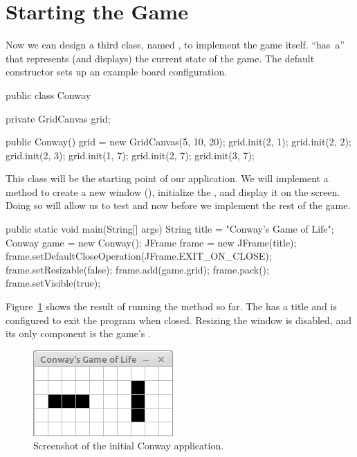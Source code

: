 \section{Starting the Game}

Now we can design a third class, named , to implement the game itself.
 ``has~a''  that represents (and displays) the current state of the game.
The default constructor sets up an example board configuration.

\begin{code}
public class Conway {
    private GridCanvas grid;

    public Conway() {
        grid = new GridCanvas(5, 10, 20);
        grid.init(2, 1);
        grid.init(2, 2);
        grid.init(2, 3);
        grid.init(1, 7);
        grid.init(2, 7);
        grid.init(3, 7);
    }
}
\end{code}


This class will be the starting point of our application.
We will implement a  method to create a new window (), initialize the , and display it on the screen.
Doing so will allow us to test  and  now before we implement the rest of the game.

\begin{code}
public static void main(String[] args) {
    String title = "Conway's Game of Life";
    Conway game = new Conway();
    JFrame frame = new JFrame(title);
    frame.setDefaultCloseOperation(JFrame.EXIT_ON_CLOSE);
    frame.setResizable(false);
    frame.add(game.grid);
    frame.pack();
    frame.setVisible(true);
}
\end{code}

Figure~\ref{fig:conway} shows the result of running the  method so far.
The  has a title and is configured to exit the program when closed.
Resizing the window is disabled, and its only component is the game's .

\begin{figure}[!ht]
\begin{center}
\includegraphics{figs/conway.png}
\caption{Screenshot of the initial Conway application.}
\label{fig:conway}
\end{center}
\end{figure}

